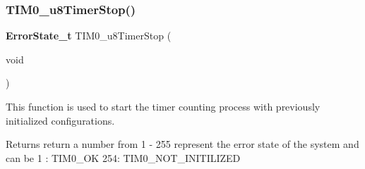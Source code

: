 \subsubsection{T\+I\+M0\+\_\+u8\+Timer\+Stop()}
{\footnotesize\ttfamily \textbf{ Error\+State\+\_\+t} T\+I\+M0\+\_\+u8\+Timer\+Stop (\begin{DoxyParamCaption}\item[{void}]{ }\end{DoxyParamCaption})}



This function is used to start the timer counting process with previously initialized configurations. 

\begin{DoxyReturn}{Returns}
return a number from 1 -\/ 255 represent the error state of the system and can be 1 \+: T\+I\+M0\+\_\+\+OK 254\+: T\+I\+M0\+\_\+\+N\+O\+T\+\_\+\+I\+N\+I\+T\+I\+L\+I\+Z\+ED 
\end{DoxyReturn}

